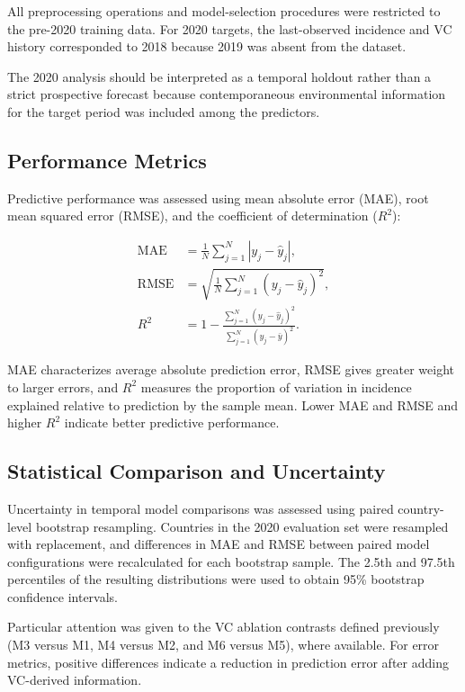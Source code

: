 \documentclass[10pt,twocolumn]{article}
\begin{document}
All preprocessing operations and model-selection procedures were
restricted to the pre-2020 training data. For 2020 targets, the
last-observed incidence and VC history corresponded to 2018 because
2019 was absent from the dataset.

The 2020 analysis should be interpreted as a temporal holdout rather
than a strict prospective forecast because contemporaneous
environmental information for the target period was included among the
predictors.


\subsection{Performance Metrics}

Predictive performance was assessed using mean absolute error (MAE),
root mean squared error (RMSE), and the coefficient of determination
(\(R^2\)):

\begin{align}
\mathrm{MAE}
&=
\frac{1}{N}
\sum_{j=1}^{N}
\left|y_j-\hat{y}_j\right|,
\\
\mathrm{RMSE}
&=
\sqrt{
\frac{1}{N}
\sum_{j=1}^{N}
\left(y_j-\hat{y}_j\right)^2
},
\\
R^2
&=
1-
\frac{
\sum_{j=1}^{N}(y_j-\hat{y}_j)^2
}{
\sum_{j=1}^{N}(y_j-\bar{y})^2
}.
\end{align}

MAE characterizes average absolute prediction error, RMSE gives greater
weight to larger errors, and \(R^2\) measures the proportion of
variation in incidence explained relative to prediction by the sample
mean. Lower MAE and RMSE and higher \(R^2\) indicate better predictive
performance.


\subsection{Statistical Comparison and Uncertainty}

Uncertainty in temporal model comparisons was assessed using paired
country-level bootstrap resampling. Countries in the 2020 evaluation
set were resampled with replacement, and differences in MAE and RMSE
between paired model configurations were recalculated for each
bootstrap sample. The 2.5th and 97.5th percentiles of the resulting
distributions were used to obtain 95\% bootstrap confidence intervals.

Particular attention was given to the VC ablation contrasts defined
previously (M3 versus M1, M4 versus M2, and M6 versus M5), where
available. For error metrics, positive differences indicate a
reduction in prediction error after adding VC-derived information.
\end{document}
